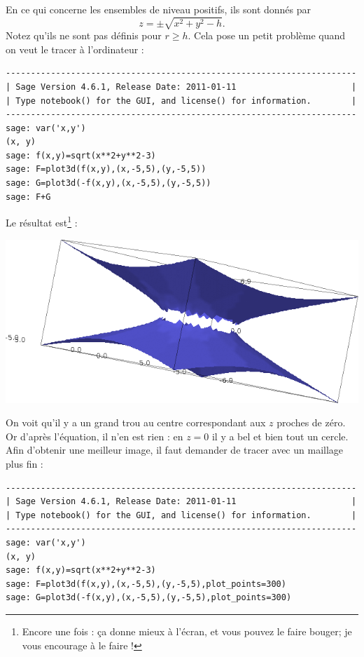 \begin{example}
    En ce qui concerne les ensembles de niveau positifs, ils sont donnés par
    \begin{equation}
        z=\pm\sqrt{x^2+y^2-h}.
    \end{equation}
    Notez qu'ils ne sont pas définis pour $r\geq h$. Cela pose un petit problème quand on veut le tracer à l'ordinateur :
    \begin{verbatim}
----------------------------------------------------------------------
| Sage Version 4.6.1, Release Date: 2011-01-11                       |
| Type notebook() for the GUI, and license() for information.        |
----------------------------------------------------------------------
sage: var('x,y')
(x, y)
sage: f(x,y)=sqrt(x**2+y**2-3)
sage: F=plot3d(f(x,y),(x,-5,5),(y,-5,5))
sage: G=plot3d(-f(x,y),(x,-5,5),(y,-5,5))
sage: F+G
    \end{verbatim}
Le résultat est\footnote{Encore une fois : ça donne mieux à l'écran, et vous pouvez le faire bouger; je vous encourage à le faire !} :
    \begin{center}
            \includegraphics[width=15cm]{pictures_bitmap/AdSmauvais.png}
    \end{center}
    On voit qu'il y a un grand trou au centre correspondant aux $z$ proches de zéro. Or d'après l'équation, il n'en est rien : en $z=0$ il y a bel et bien tout un cercle. Afin d'obtenir une meilleur image, il faut demander de tracer avec un maillage plus fin :
    \begin{verbatim}
----------------------------------------------------------------------
| Sage Version 4.6.1, Release Date: 2011-01-11                       |
| Type notebook() for the GUI, and license() for information.        |
----------------------------------------------------------------------
sage: var('x,y')
(x, y)
sage: f(x,y)=sqrt(x**2+y**2-3)
sage: F=plot3d(f(x,y),(x,-5,5),(y,-5,5),plot_points=300)
sage: G=plot3d(-f(x,y),(x,-5,5),(y,-5,5),plot_points=300)

\end{verbatim}
\end{example}
